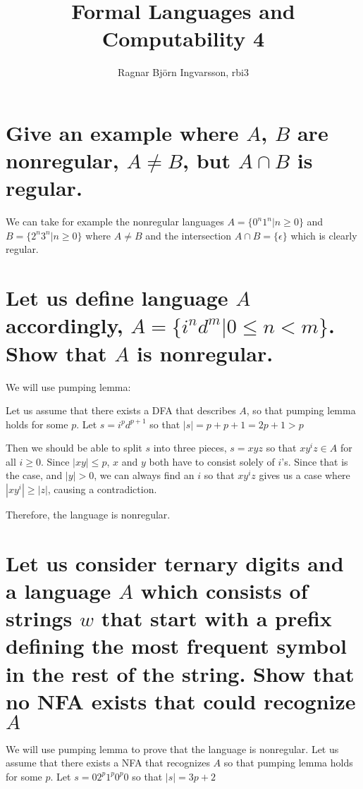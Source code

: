 \documentclass{article}
\title{Formal Languages and Computability 4}
\author{Ragnar Björn Ingvarsson, rbi3}
\begin{document}
\renewcommand\thepage{}
	
	\maketitle

	\newpage
	\setcounter{page}{1}
	\renewcommand\thepage{\arabic{page}}
	\section{Give an example where $A$, $B$ are nonregular, $A\neq B$, but 
	$A\cap B$ is regular.}

	We can take for example the nonregular languages $A=\{0^n1^n | n\geq 0\}$
	 and $B=\{2^n3^n | n\geq0\}$ where $A\neq B$ and the intersection 
	 $A\cap B = \{\epsilon\}$ which is clearly regular.

	 \section{Let us define language $A$ accordingly, $A = \{i^nd^m | 0 
	 \leq n < m\}$. Show that $A$ is nonregular.}

	 We will use pumping lemma:

	 Let us assume that there exists a DFA that describes $A$, so that 
	 pumping lemma holds for some $p$. Let $s=i^pd^{p+1}$ so that 
	 $|s| = p+p+1 = 2p+1 > p$

	 Then we should be able to split $s$ into three pieces, $s = xyz$ so 
	 that $xy^iz\in A$ for all $i \geq 0$. Since $|xy| \leq p$, $x$ and $y$ 
	 both have to consist solely of $i$'s. Since that is the case, and 
	 $|y| > 0$, we can always find an $i$ so that $xy^iz$ gives us a case 
	 where $|xy^i| \geq |z|$, causing a contradiction.

	 Therefore, the language is nonregular.

	 \section{Let us consider ternary digits and a language $A$ which 
		 consists of strings $w$ that start with a prefix defining the most 
		 frequent symbol in the rest of the string. Show that no NFA exists 
		 that could recognize $A$}

		 We will use pumping lemma to prove that the language is nonregular. 
		 Let us assume that there exists a NFA that recognizes $A$ so that 
		 pumping lemma holds for some $p$. Let $s=02^p1^p0^p0$
		 so that $|s| = 3p+2$
\end{document}
